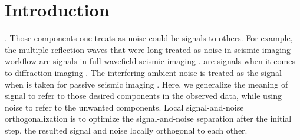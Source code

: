 \maketitle


\section{Introduction}
. Those components one treats as noise could be signals to others. For example, the multiple reflection waves that were long treated as noise in  seismic imaging workflow are signals in full wavefield seismic imaging \cite[]{verschuur2011}.  are signals when it comes to diffraction imaging \cite[]{fomel2007}. The interfering ambient noise is treated as the signal when is taken for passive seismic imaging \cite[]{de2011ambient}.  Here, we generalize the meaning of signal to refer to those desired components in the observed data, while using noise to refer to the  unwanted components. Local signal-and-noise orthogonalization \cite[]{yangkang2015ortho} is  to optimize the signal-and-noise separation after the initial  step,  the resulted signal and noise locally orthogonal to each other. 

